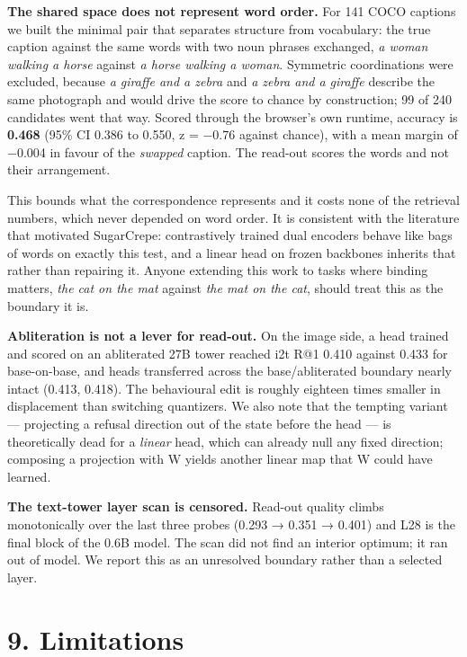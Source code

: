 \documentclass[
  11pt,
]{article}
\newcounter{none} %
\begin{document}
\textbf{The shared space does not represent word order.} For 141 COCO
captions we built the minimal pair that separates structure from
vocabulary: the true caption against the same words with two noun
phrases exchanged, \emph{a woman walking a horse} against \emph{a horse
walking a woman}. Symmetric coordinations were excluded, because \emph{a
giraffe and a zebra} and \emph{a zebra and a giraffe} describe the same
photograph and would drive the score to chance by construction; 99 of
240 candidates went that way. Scored through the browser's own runtime,
accuracy is \textbf{0.468} (95\% CI 0.386 to 0.550, z = −0.76 against
chance), with a mean margin of −0.004 in favour of the \emph{swapped}
caption. The read-out scores the words and not their arrangement.

This bounds what the correspondence represents and it costs none of the
retrieval numbers, which never depended on word order. It is consistent
with the literature that motivated SugarCrepe: contrastively trained
dual encoders behave like bags of words on exactly this test, and a
linear head on frozen backbones inherits that rather than repairing it.
Anyone extending this work to tasks where binding matters, \emph{the cat
on the mat} against \emph{the mat on the cat}, should treat this as the
boundary it is.

\textbf{Abliteration is not a lever for read-out.} On the image side, a
head trained and scored on an abliterated 27B tower reached i2t R@1
0.410 against 0.433 for base-on-base, and heads transferred across the
base/abliterated boundary nearly intact (0.413, 0.418). The behavioural
edit is roughly eighteen times smaller in displacement than switching
quantizers. We also note that the tempting variant --- projecting a
refusal direction out of the state before the head --- is theoretically
dead for a \emph{linear} head, which can already null any fixed
direction; composing a projection with W yields another linear map that
W could have learned.

\textbf{The text-tower layer scan is censored.} Read-out quality climbs
monotonically over the last three probes (0.293 → 0.351 → 0.401) and L28
is the final block of the 0.6B model. The scan did not find an interior
optimum; it ran out of model. We report this as an unresolved boundary
rather than a selected layer.

\section{9. Limitations}\label{limitations}
\end{document}
